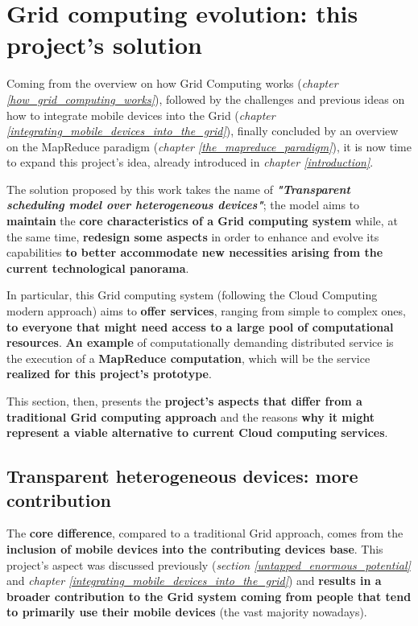 \section{Grid computing evolution: this project's solution}
Coming from the overview on how Grid Computing works (\textit{chapter \ref{how_grid_computing_works}}), followed by the challenges and previous ideas on how to integrate mobile devices into the Grid (\textit{chapter \ref{integrating_mobile_devices_into_the_grid}}), finally concluded by an overview on the MapReduce paradigm (\textit{chapter \ref{the_mapreduce_paradigm}}), it is now time to expand this project's idea, already introduced in \textit{chapter \ref{introduction}}.

The solution proposed by this work takes the name of \textbf{\textit{"Transparent scheduling model over heterogeneous devices"}}; the model aims to \textbf{maintain} the \textbf{core characteristics of a Grid computing system} while, at the same time, \textbf{redesign some aspects} in order to enhance and evolve its capabilities \textbf{to better accommodate new necessities arising from the current technological panorama}.

In particular, this Grid computing system (following the Cloud Computing modern approach) aims to \textbf{offer services}, ranging from simple to complex ones, \textbf{to everyone that might need access to a large pool of computational resources}. \textbf{An example} of computationally demanding distributed service is the execution of a \textbf{MapReduce computation}, which will be the service \textbf{realized for this project's prototype}.

This section, then, presents the \textbf{project's aspects that differ from a traditional Grid computing approach} and the reasons \textbf{why it might represent a viable alternative to current Cloud computing services}.

\subsection{Transparent heterogeneous devices: more contribution}\label{transparent_heterogeneous_devices_more_contribution}
The \textbf{core difference}, compared to a traditional Grid approach, comes from the \textbf{inclusion of mobile devices into the contributing devices base}.
This project's aspect was discussed previously (\textit{section \ref{untapped_enormous_potential}} and \textit{chapter \ref{integrating_mobile_devices_into_the_grid}}) and \textbf{results in a broader contribution to the Grid system coming from people that tend to primarily use their mobile devices} (the vast majority nowadays).

